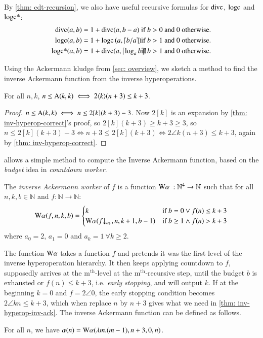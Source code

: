 \begin{rem}
	By \cref{thm: cdt-recursion}, we also have useful recursive formulas for $\text{divc}$, $\text{logc}$ and $\text{logc*}$:
	\begin{align*}
	\divc(a, b) & = 1 + \divc(a, b - a) &\hspace{-20pt} \text{ if } b > 0 &\text{ and } 0 \text{ otherwise}. \\
	\logc(a, b) & = 1 + \logc\left(a, \left\lceil b/a \right\rceil\right) &\hspace{-20pt} \text{ if } b > 1 &\text{ and } 0 \text{ otherwise}. \\
	\logstarc(a, b) & = 1 + \divc(a, \left\lceil \log_ab \right\rceil) &\hspace{-20pt} \text{ if } b > 1 &\text{ and } 0 \text{ otherwise}.
	\end{align*}
\end{rem}
Using the Ackermann kludge from \cref{sec: overview}, we sketch a method to find the inverse Ackermann function from the inverse hyperoperations.
\begin{thm} \label{thm: inv-hyperop-inv-ack}
	For all $n, k$, $n\le \text{A}(k, k) \iff 2\langle k\rangle(n+3)\le k+3$.
\end{thm}
\begin{proof}
	$n\le \text{A}(k, k) \iff n\le 2[k](k+3) - 3$. Now $2[k]$ is an expansion by \cref{thm: inv-hyperop-correct}'s proof, so $2[k](k+3) \ge k+3\ge 3$, so  $n\le 2[k](k+3) - 3 \iff n+3 \le 2[k](k+3)\iff 2\angle{k}(n+3)\le k+3$, again by \cref{thm: inv-hyperop-correct}.
\end{proof}
 allows a simple method to compute the Inverse Ackermann function, based on the \emph{budget} idea in \emph{countdown worker}.
\begin{defn}
	The \emph{inverse Ackermann worker} of $f$ is a function $\text{W}\alpha\ : \mathbb{N}^4\to \mathbb{N}$ such that for all $n, k, b\in \mathbb{N}$ and $f:\mathbb{N}\to \mathbb{N}$:
	$$ \W\alpha(f, n, k, b) = \begin{cases}
	k & \text{if } b = 0 \vee f(n)\le k+3 \\ \W\alpha(\cdt{f}{a_k}\ , n, k+1, b-1) & \text{if } b \ge 1 \wedge f(n) > k+3
	\end{cases} $$
	where $a_0 = 2$, $a_1 = 0$ and $a_k = 1 \ \forall k\ge 2$.
\end{defn}
The function $\text{W}\alpha$ takes a function $f$ and pretends it was the first level of the inverse hyperoperation hierarchy. It then keeps applying countdown to $f$, supposedly arrives at the $\text{m}^{\text{th}}$-level at the $\text{m}^{\text{th}}$-recursive step, until the budget $b$ is exhausted or $f(n)\le k+3$, i.e. \emph{early stopping}, and will output $k$. If at the beginning $k=0$ and $f = 2\angle{0}$, the early stopping condition becomes $2\angle{k}n \le k+3$, which when replace $n$ by $n+3$ gives what we need in \cref{thm: inv-hyperop-inv-ack}.
The inverse Ackermann function can be defined as follows.
\begin{thm} For all $n$, we have $\alpha(n) = \text{W}\alpha(\lambda m.(m - 1), n+3, 0, n)$.
\end{thm}